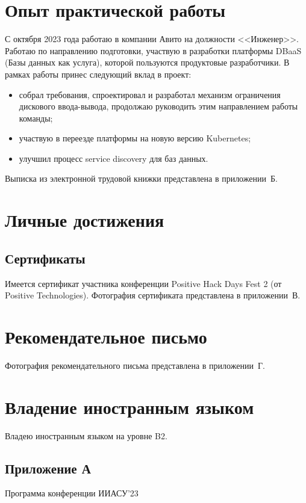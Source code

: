 \documentclass[14pt]{extarticle}
\begin{document}
\section{Опыт практической работы}

С октября 2023 года работаю в компании Авито на должности <<Инженер>>. Работаю по направлению подготовки, участвую в разработки платформы DBaaS (Базы данных как услуга), которой пользуются продуктовые разработчики. В рамках работы принес следующий вклад в проект:

\begin{itemize}
	\item собрал требования, спроектировал и разработал механизм ограничения дискового ввода-вывода, продолжаю руководить этим направлением работы команды;
	\item участвую в переезде платформы на новую версию Kubernetes;
	\item улучшил процесс service discovery для баз данных.
\end{itemize}

Выписка из электронной трудовой книжки представлена в приложении~Б.

\section{Личные достижения}

\subsection{Сертификаты}

Имеется сертификат участника конференции Positive Hack Days Fest 2 (от Positive Technologies). Фотография сертификата представлена в приложении~В.

\section{Рекомендательное письмо}

Фотография рекомендательного письма представлена в приложении~Г.

\section{Владение иностранным языком}

Владею иностранным языком на уровне B2.

\newpage

\begin{center}
\section*{Приложение А}

Программа конференции ИИАСУ'23
\end{center}
\end{document}
